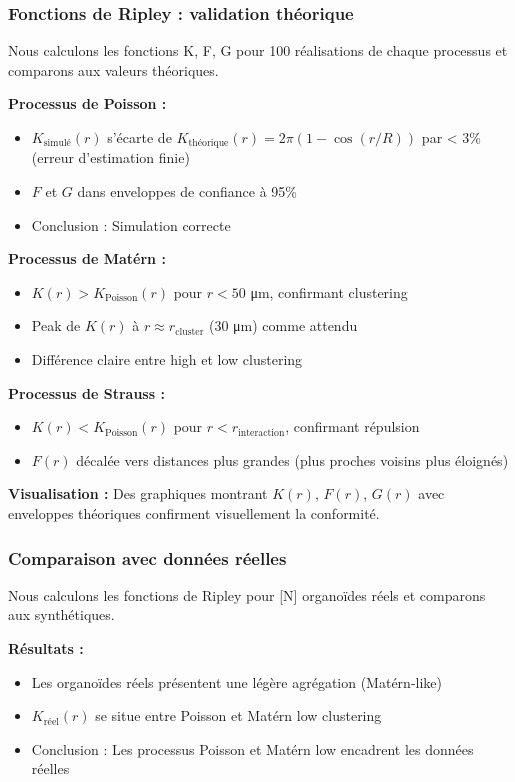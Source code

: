 \subsubsection{Fonctions de Ripley : validation théorique}

Nous calculons les fonctions K, F, G pour 100 réalisations de chaque processus et comparons aux valeurs théoriques.

\textbf{Processus de Poisson :}
\begin{itemize}
    \item $K_{\text{simulé}}(r)$ s'écarte de $K_{\text{théorique}}(r) = 2\pi(1-\cos(r/R))$ par < 3\% (erreur d'estimation finie)
    \item $F$ et $G$ dans enveloppes de confiance à 95\%
    \item Conclusion : Simulation correcte
\end{itemize}

\textbf{Processus de Matérn :}
\begin{itemize}
    \item $K(r) > K_{\text{Poisson}}(r)$ pour $r < 50$ μm, confirmant clustering
    \item Peak de $K(r)$ à $r \approx r_{\text{cluster}}$ (30 μm) comme attendu
    \item Différence claire entre high et low clustering
\end{itemize}

\textbf{Processus de Strauss :}
\begin{itemize}
    \item $K(r) < K_{\text{Poisson}}(r)$ pour $r < r_{\text{interaction}}$, confirmant répulsion
    \item $F(r)$ décalée vers distances plus grandes (plus proches voisins plus éloignés)
\end{itemize}

\textbf{Visualisation :}
Des graphiques montrant $K(r)$, $F(r)$, $G(r)$ avec enveloppes théoriques confirment visuellement la conformité.

\subsubsection{Comparaison avec données réelles}

Nous calculons les fonctions de Ripley pour [N] organoïdes réels et comparons aux synthétiques.

\textbf{Résultats :}
\begin{itemize}
    \item Les organoïdes réels présentent une légère agrégation (Matérn-like)
    \item $K_{\text{réel}}(r)$ se situe entre Poisson et Matérn low clustering
    \item Conclusion : Les processus Poisson et Matérn low encadrent les données réelles
\end{itemize}

